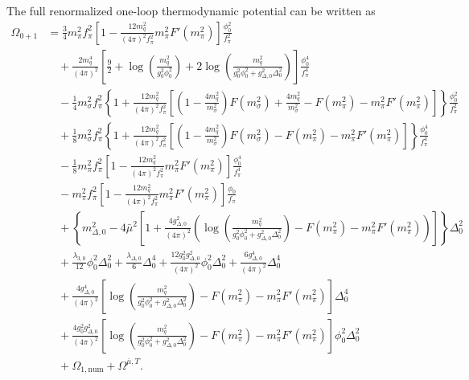 The full renormalized one-loop thermodynamic potential can be written as
\begin{align}
\Omega_{0+1}
&=
\frac{3}{4}m_\pi^2 f_\pi^2
\left[
1-
\frac{12m_q^2}{(4\pi)^2f_\pi^2}
m_\pi^2F'(m_\pi^2)
\right]
\frac{\phi_0^2}{f_\pi^2}
\nonumber \\
&\quad
+
\frac{2m_q^4}{(4\pi)^2}
\left[
\frac{9}{2}
+
\log\!\left(\frac{m_q^2}{g_0^2\phi_0^2}\right)
+
2\log\!\left(
\frac{m_q^2}{g_0^2\phi_0^2+g_{\Delta,0}^2\Delta_0^2}
\right)
\right]
\frac{\phi_0^4}{f_\pi^4}
\nonumber \\
&\quad
-
\frac{1}{4}m_\sigma^2 f_\pi^2
\left\{
1+
\frac{12m_q^2}{(4\pi)^2f_\pi^2}
\left[
\left(1-\frac{4m_q^2}{m_\sigma^2}\right)F(m_\sigma^2)
+
\frac{4m_q^2}{m_\sigma^2}
-
F(m_\pi^2)
-
m_\pi^2F'(m_\pi^2)
\right]
\right\}
\frac{\phi_0^2}{f_\pi^2}
\nonumber \\
&\quad
+
\frac{1}{8}m_\sigma^2 f_\pi^2
\left\{
1+
\frac{12m_q^2}{(4\pi)^2f_\pi^2}
\left[
\left(1-\frac{4m_q^2}{m_\sigma^2}\right)F(m_\sigma^2)
-
F(m_\pi^2)
-
m_\pi^2F'(m_\pi^2)
\right]
\right\}
\frac{\phi_0^4}{f_\pi^4}
\nonumber \\
&\quad
-
\frac{1}{8}m_\pi^2 f_\pi^2
\left[
1-
\frac{12m_q^2}{(4\pi)^2f_\pi^2}
m_\pi^2F'(m_\pi^2)
\right]
\frac{\phi_0^4}{f_\pi^4}
\nonumber \\
&\quad
-
m_\pi^2 f_\pi^2
\left[
1-
\frac{12m_q^2}{(4\pi)^2f_\pi^2}
m_\pi^2F'(m_\pi^2)
\right]
\frac{\phi_0}{f_\pi}
\nonumber \\
&\quad
+
\left\{
m_{\Delta,0}^2
-
4\bar{\mu}^2
\left[
1+
\frac{4g_{\Delta,0}^2}{(4\pi)^2}
\left(
\log\!\left(
\frac{m_q^2}
{g_0^2\phi_0^2+g_{\Delta,0}^2\Delta_0^2}
\right)
-
F(m_\pi^2)
-
m_\pi^2F'(m_\pi^2)
\right)
\right]
\right\}
\Delta_0^2
\nonumber \\
&\quad
+
\frac{\lambda_{3,0}}{12}\phi_0^2\Delta_0^2
+
\frac{\lambda_{\Delta,0}}{6}\Delta_0^4
+
\frac{12g_0^2g_{\Delta,0}^2}{(4\pi)^2}\phi_0^2\Delta_0^2
+
\frac{6g_{\Delta,0}^4}{(4\pi)^2}\Delta_0^4
\nonumber \\
&\quad
+
\frac{4g_{\Delta,0}^4}{(4\pi)^2}
\left[
\log\!\left(
\frac{m_q^2}
{g_0^2\phi_0^2+g_{\Delta,0}^2\Delta_0^2}
\right)
-
F(m_\pi^2)
-
m_\pi^2F'(m_\pi^2)
\right]\Delta_0^4
\nonumber \\
&\quad
+
\frac{4g_0^2g_{\Delta,0}^2}{(4\pi)^2}
\left[
\log\!\left(
\frac{m_q^2}
{g_0^2\phi_0^2+g_{\Delta,0}^2\Delta_0^2}
\right)
-
F(m_\pi^2)
-
m_\pi^2F'(m_\pi^2)
\right]\phi_0^2\Delta_0^2
\nonumber \\
&\quad
+
\Omega_{1,\mathrm{num}}
+
\Omega^{\bar{\mu},T}.
\label{eq:app_qmd_full_potential}
\end{align}


